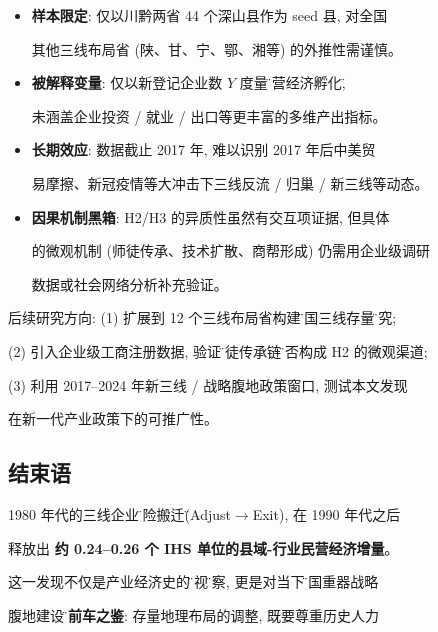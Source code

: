 \begin{itemize}

\item \textbf{样本限定}: 仅以川黔两省 44 个深山县作为 seed 县, 对全国

      其他三线布局省 (陕、甘、宁、鄂、湘等) 的外推性需谨慎。

\item \textbf{被解释变量}: 仅以新登记企业数 $Y$ 度量\"民营经济孵化\",

      未涵盖企业投资 / 就业 / 出口等更丰富的多维产出指标。

\item \textbf{长期效应}: 数据截止 2017 年, 难以识别 2017 年后中美贸

      易摩擦、新冠疫情等大冲击下三线反流 / 归巢 / 新三线等动态。

\item \textbf{因果机制黑箱}: H2/H3 的异质性虽然有交互项证据, 但具体

      的微观机制 (师徒传承、技术扩散、商帮形成) 仍需用企业级调研

      数据或社会网络分析补充验证。

\end{itemize}



\begin{commentblock}

后续研究方向: (1) 扩展到 12 个三线布局省构建\"全国三线存量\"研究;

(2) 引入企业级工商注册数据, 验证\"师徒传承链\"是否构成 H2 的微观渠道;

(3) 利用 2017--2024 年新三线 / 战略腹地政策窗口, 测试本文发现

    在新一代产业政策下的可推广性。

\end{commentblock}



\subsection*{结束语}



1980 年代的三线企业\"脱险搬迁\" (Adjust$\rightarrow$Exit), 在 1990 年代之后

释放出 \textbf{约 0.24--0.26 个 IHS 单位的县域-行业民营经济增量}。

这一发现不仅是产业经济史的\"后视\"观察, 更是对当下\"大国重器战略

腹地建设\"的\textbf{前车之鉴}: 存量地理布局的调整, 既要尊重历史人力


